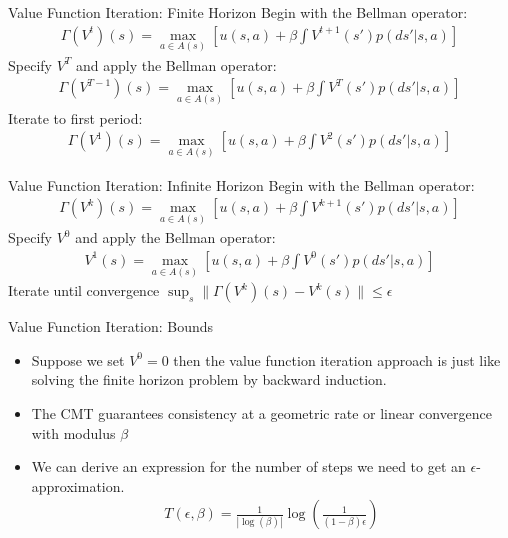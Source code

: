 \documentclass[aspectratio=169,11pt]{beamer}
\begin{document}
\begin{frame}{Value Function Iteration: Finite Horizon}
Begin with the Bellman operator:
\begin{eqnarray*}
\Gamma(V^t)(s) = \max_{a \in A(s)} \left[ u(s,a) + \beta \int V^{t+1}(s')p(ds' | s,a) \right]
\end{eqnarray*}
Specify $V^T$ and apply the Bellman operator:
\begin{eqnarray*}
\Gamma(V^{T-1})(s) = \max_{a \in A(s)} \left[ u(s,a) + \beta \int V^{T}(s')p(ds' | s,a) \right]
\end{eqnarray*}
Iterate to first period:
\begin{eqnarray*}
\Gamma(V^1)(s) = \max_{a \in A(s)} \left[ u(s,a) + \beta \int V^{2}(s')p(ds' | s,a) \right]
\end{eqnarray*}
\end{frame}

\begin{frame}{Value Function Iteration: Infinite Horizon}
Begin with the Bellman operator:
\begin{eqnarray*}
\Gamma(V^k)(s) = \max_{a \in A(s)} \left[ u(s,a) + \beta \int V^{k+1}(s')p(ds' | s,a) \right]
\end{eqnarray*}
Specify $V^0$ and apply the Bellman operator:
\begin{eqnarray*}
V^{1}(s) = \max_{a \in A(s)} \left[ u(s,a) + \beta \int V^{0}(s')p(ds' | s,a) \right]
\end{eqnarray*}
Iterate until convergence  $ \sup_s \| \Gamma(V^k)(s) - V^k(s) \| \leq \epsilon $
\end{frame}

\begin{frame}{Value Function Iteration: Bounds}
\begin{itemize}
\item Suppose we set $V^0 =0$ then the value function iteration approach is just like solving the finite horizon problem by backward induction.
\item The CMT guarantees consistency at a geometric rate or \alert{linear} convergence with modulus $\beta$
\item We can derive an expression for the number of steps we need to get an $\epsilon$-approximation.
\begin{eqnarray*}
T(\epsilon,\beta) = \frac{1}{| \log(\beta) | } \log \left (\frac{1}{(1-\beta)\epsilon} \right)
\end{eqnarray*}
\end{itemize}
\end{frame}
\end{document}
